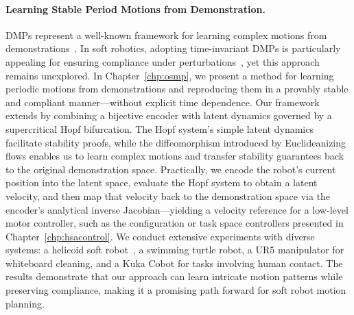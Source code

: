 \paragraph{Learning Stable Period Motions from Demonstration.}
\glspl{DMP} represent a well-known framework for learning complex motions from demonstrations~\cite{ijspeert2013dynamical, saveriano2023dynamic}. In soft robotics, adopting time-invariant \glspl{DMP} is particularly appealing for ensuring compliance under perturbations~\cite{ijspeert2013dynamical}, yet this approach remains unexplored. In Chapter~\ref{chp:osmp}, we present a method for learning periodic motions from demonstrations and reproducing them in a provably stable and compliant manner—without explicit time dependence.
% 
Our framework extends \cite{ijspeert2013dynamical, rana2020euclideanizing, perez2023stable} by combining a bijective encoder with latent dynamics governed by a supercritical Hopf bifurcation. The Hopf system’s simple latent dynamics facilitate stability proofs, while the diffeomorphism introduced by Euclideanizing flows\cite{dinh2016density, rana2020euclideanizing} enables us to learn complex motions and transfer stability guarantees back to the original demonstration space. Practically, we encode the robot’s current position into the latent space, evaluate the Hopf system to obtain a latent velocity, and then map that velocity back to the demonstration space via the encoder’s analytical inverse Jacobian—yielding a velocity reference for a low-level motor controller, such as the configuration or task space controllers presented in Chapter~\ref{chp:hsacontrol}.
% 
We conduct extensive experiments with diverse systems: a helicoid soft robot~\cite{guan2023trimmed}, a swimming turtle robot, a UR5 manipulator for whiteboard cleaning, and a Kuka \gls{Cobot} for tasks involving human contact. The results demonstrate that our approach can learn intricate motion patterns while preserving compliance, making it a promising path forward for soft robot motion planning.